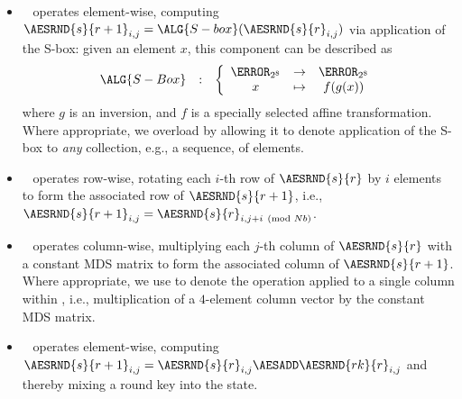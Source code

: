 \begin{itemize}

\item {}
      ~\cite[Section 5.1.1]{FIPS:197}
      operates element-wise,
      computing
      $\AESRND{s}{r+1}_{i,j} = \ALG{S-box}( \AESRND{s}{r}_{i,j} )$
      via application of the S-box:
      given an element $x$, this component can be described as
      \[
      \begin{array}{lcl}
      \ALG{S-Box} &:& \left\{\begin{array}{ccc}
                             \F_{2^8} &\rightarrow& \F_{2^8} \\
                             x        &\mapsto    & f(g(x))  \\
                             \end{array}
                      \right.
      \end{array}
      \]
      where 
      $g$ is an inversion, 
      and 
      $f$ is a specially selected affine transformation.
      Where appropriate,
      we overload  by allowing it to denote application 
      of the S-box to {\em any} collection, e.g., a sequence, of elements.

\item {}
      ~\cite[Section 5.1.2]{FIPS:197}
      operates     row-wise,
      rotating each 
      $i$-th row 
      of 
      $\AESRND{s}{r  }$
      by $i$ elements
      to form 
      the associated row    of
      $\AESRND{s}{r+1}$,
      i.e.,
      $\AESRND{s}{r+1}_{i,j} = \AESRND{s}{r}_{i,j + i \pmod{Nb}}$.

\item {}
      ~\cite[Section 5.1.3]{FIPS:197}
      operates  column-wise,
      multiplying each 
      $j$-th column
      of 
      $\AESRND{s}{r  }$
      with a constant MDS matrix
      to form 
      the associated column of
      $\AESRND{s}{r+1}$.
      Where appropriate,
      we use
      to denote
      the operation applied to a single column within ,
      i.e., multiplication of a $4$-element column vector by the constant
      MDS matrix.
      
\item {}
      ~\cite[Section 5.1.4]{FIPS:197}
      operates element-wise,
      computing
      $\AESRND{s}{r+1}_{i,j} = \AESRND{s}{r}_{i,j} \AESADD \AESRND{rk}{r}_{i,j}$ 
      and thereby mixing a round key into the state.

\end{itemize}

